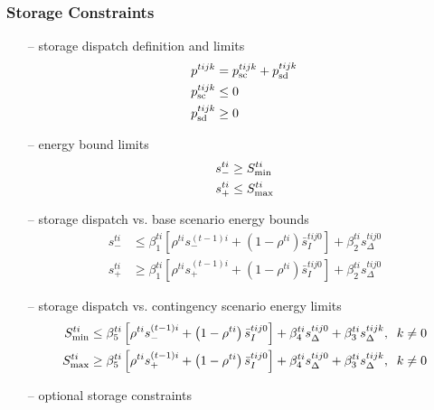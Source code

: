 \documentclass[12pt]{article}
\numberwithin{equation}{section}
\numberwithin{table}{section}
\numberwithin{figure}{section}
\begin{document}
\subsubsection*{Storage Constraints}
\begin{itemize}
\item[--] storage dispatch definition and limits
\begin{align}
p^{tijk} &= p^{tijk}_{\rm sc} + p^{tijk}_{\rm sd} \\
p^{tijk}_{\rm sc} &\leq 0 \\
p^{tijk}_{\rm sd} &\geq 0
\end{align}

\item[--] energy bound limits
\begin{align}
s_-^{ti} &\geq S^{ti}_{\rm min} \\
s^{ti}_+ &\leq S^{ti}_{\rm max}
\end{align}

\item[--] storage dispatch vs. base scenario energy bounds
\begin{align}
s^{ti}_- &\leq \beta_1^{ti} \left[\rho^{ti} s^{(t-1)i}_- + \left(1-\rho^{ti}\right) \bar{s}_I^{tij0}\right] + \beta_2^{ti} s_\Delta^{tij0} \label{eq:storage1st} \\
s^{ti}_+ &\geq \beta_1^{ti} \left[\rho^{ti} s^{(t-1)i}_+ + \left(1-\rho^{ti}\right) \bar{s}_I^{tij0}\right] + \beta_2^{ti} s_\Delta^{tij0} \label{eq:storage2nd}
\end{align}

\item[--] storage dispatch vs. contingency scenario energy limits
\begin{align}
S^{ti}_{\rm min} &\leq \beta_5^{ti} \left[\rho^{ti} s^{(t-1)i}_- + \left(1-\rho^{ti}\right) \bar{s}_I^{tij0}\right] + \beta_4^{ti} s_\Delta^{tij0} + \beta_3^{ti} s_\Delta^{tijk}, \;\; k\neq 0 \\
S^{ti}_{\rm max} &\geq \beta_5^{ti} \left[\rho^{ti} s^{(t-1)i}_+ + \left(1-\rho^{ti}\right) \bar{s}_I^{tij0}\right] + \beta_4^{ti} s_\Delta^{tij0} + \beta_3^{ti} s_\Delta^{tijk}, \;\; k\neq 0
\label{eq:storagecontingencylast}
\end{align}

\item[--] optional storage constraints
\begin{itemize}


\end{itemize}
\end{itemize}
\end{document}
